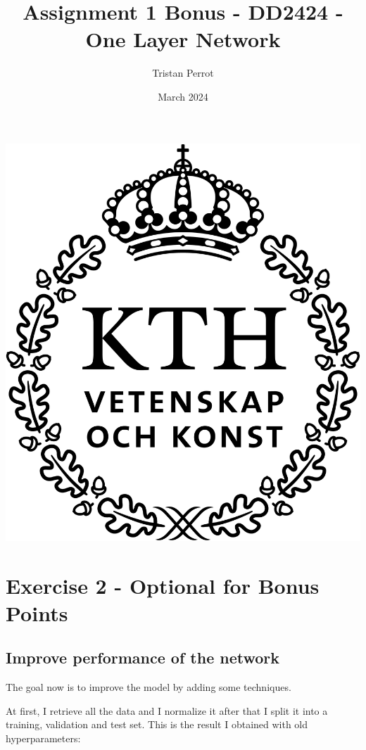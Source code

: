 \documentclass{article}
\title{Assignment 1 Bonus - DD2424 - One Layer Network}
\author{Tristan Perrot}
\date{March 2024}
\begin{document}
\maketitle
\begin{center}
    \includegraphics[scale=0.25]{images/KTH_logo_RGB_svart.png}
\end{center}

\section{Exercise 2 - Optional for Bonus Points}

\subsection{Improve performance of the network}

The goal now is to improve the model by adding some techniques.

At first, I retrieve all the data and I normalize it after that I split it into a training, validation and test set.
This is the result I obtained with old hyperparameters:
\end{document}
